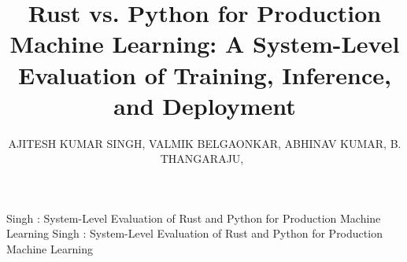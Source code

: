 \documentclass{ieeeaccess}
\begin{document}

\title{Rust vs. Python for Production Machine Learning: A System-Level Evaluation of Training, Inference, and Deployment}

\author{
\uppercase{Ajitesh Kumar Singh},
\uppercase{Valmik Belgaonkar},
\uppercase{Abhinav Kumar},
\uppercase{B. Thangaraju},~
}

\address[1]{Department of Electronics and Communication Engineering, International Institute of Information Technology Bangalore, Bengaluru, India}
\address[2]{Department of Computer Science and Engineering, International Institute of Information Technology Bangalore, Bengaluru, India}

\markboth
{Singh \headeretal: System-Level Evaluation of Rust and Python for Production Machine Learning}
{Singh \headeretal: System-Level Evaluation of Rust and Python for Production Machine Learning}

\end{document}
